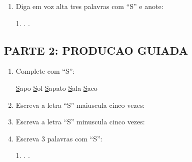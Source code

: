 \begin{exercicio}
\begin{enumerate}
  \item Diga em voz alta tres palavras com ``S'' e anote:
  \begin{center}
  1. \underline{\hspace{4cm}} . \underline{\hspace{4cm}} . \underline{\hspace{4cm}}
  \end{center}
\end{enumerate}

\subsection*{PARTE 2: PRODUCAO GUIADA}

\begin{enumerate}[resume]
  \item Complete com ``S'':
  \begin{center}
  \underline{S}apo \quad \underline{S}ol \quad \underline{S}apato \quad \underline{S}ala \quad \underline{S}aco
  \end{center}

  \item Escreva a letra ``S'' maiuscula cinco vezes:
  \begin{center}
  \underline{\hspace{1.5cm}} \quad \underline{\hspace{1.5cm}} \quad \underline{\hspace{1.5cm}} \quad \underline{\hspace{1.5cm}} \quad \underline{\hspace{1.5cm}}
  \end{center}

  \item Escreva a letra ``S'' minuscula cinco vezes:
  \begin{center}
  \underline{\hspace{1.5cm}} \quad \underline{\hspace{1.5cm}} \quad \underline{\hspace{1.5cm}} \quad \underline{\hspace{1.5cm}} \quad \underline{\hspace{1.5cm}}
  \end{center}

  \item Escreva 3 palavras com ``S'':
  \begin{center}
  1. \underline{\hspace{4cm}} . \underline{\hspace{4cm}} . \underline{\hspace{4cm}}
  \end{center}


\end{enumerate}
\end{exercicio}
